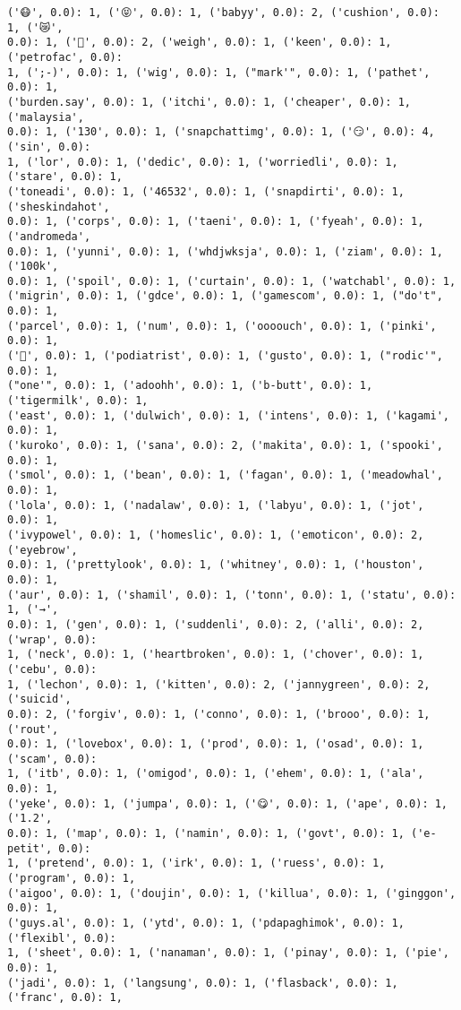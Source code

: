 \documentclass[11pt]{article}
\begin{document}
\begin{Verbatim}[commandchars=\\\{\}]
('😷', 0.0): 1, ('😝', 0.0): 1, ('babyy', 0.0): 2, ('cushion', 0.0): 1, ('😿',
0.0): 1, ('💓', 0.0): 2, ('weigh', 0.0): 1, ('keen', 0.0): 1, ('petrofac', 0.0):
1, (';-)', 0.0): 1, ('wig', 0.0): 1, ("mark'", 0.0): 1, ('pathet', 0.0): 1,
('burden.say', 0.0): 1, ('itchi', 0.0): 1, ('cheaper', 0.0): 1, ('malaysia',
0.0): 1, ('130', 0.0): 1, ('snapchattimg', 0.0): 1, ('😏', 0.0): 4, ('sin', 0.0):
1, ('lor', 0.0): 1, ('dedic', 0.0): 1, ('worriedli', 0.0): 1, ('stare', 0.0): 1,
('toneadi', 0.0): 1, ('46532', 0.0): 1, ('snapdirti', 0.0): 1, ('sheskindahot',
0.0): 1, ('corps', 0.0): 1, ('taeni', 0.0): 1, ('fyeah', 0.0): 1, ('andromeda',
0.0): 1, ('yunni', 0.0): 1, ('whdjwksja', 0.0): 1, ('ziam', 0.0): 1, ('100k',
0.0): 1, ('spoil', 0.0): 1, ('curtain', 0.0): 1, ('watchabl', 0.0): 1,
('migrin', 0.0): 1, ('gdce', 0.0): 1, ('gamescom', 0.0): 1, ("do't", 0.0): 1,
('parcel', 0.0): 1, ('num', 0.0): 1, ('oooouch', 0.0): 1, ('pinki', 0.0): 1,
('👣', 0.0): 1, ('podiatrist', 0.0): 1, ('gusto', 0.0): 1, ("rodic'", 0.0): 1,
("one'", 0.0): 1, ('adoohh', 0.0): 1, ('b-butt', 0.0): 1, ('tigermilk', 0.0): 1,
('east', 0.0): 1, ('dulwich', 0.0): 1, ('intens', 0.0): 1, ('kagami', 0.0): 1,
('kuroko', 0.0): 1, ('sana', 0.0): 2, ('makita', 0.0): 1, ('spooki', 0.0): 1,
('smol', 0.0): 1, ('bean', 0.0): 1, ('fagan', 0.0): 1, ('meadowhal', 0.0): 1,
('lola', 0.0): 1, ('nadalaw', 0.0): 1, ('labyu', 0.0): 1, ('jot', 0.0): 1,
('ivypowel', 0.0): 1, ('homeslic', 0.0): 1, ('emoticon', 0.0): 2, ('eyebrow',
0.0): 1, ('prettylook', 0.0): 1, ('whitney', 0.0): 1, ('houston', 0.0): 1,
('aur', 0.0): 1, ('shamil', 0.0): 1, ('tonn', 0.0): 1, ('statu', 0.0): 1, ('→',
0.0): 1, ('gen', 0.0): 1, ('suddenli', 0.0): 2, ('alli', 0.0): 2, ('wrap', 0.0):
1, ('neck', 0.0): 1, ('heartbroken', 0.0): 1, ('chover', 0.0): 1, ('cebu', 0.0):
1, ('lechon', 0.0): 1, ('kitten', 0.0): 2, ('jannygreen', 0.0): 2, ('suicid',
0.0): 2, ('forgiv', 0.0): 1, ('conno', 0.0): 1, ('brooo', 0.0): 1, ('rout',
0.0): 1, ('lovebox', 0.0): 1, ('prod', 0.0): 1, ('osad', 0.0): 1, ('scam', 0.0):
1, ('itb', 0.0): 1, ('omigod', 0.0): 1, ('ehem', 0.0): 1, ('ala', 0.0): 1,
('yeke', 0.0): 1, ('jumpa', 0.0): 1, ('😋', 0.0): 1, ('ape', 0.0): 1, ('1.2',
0.0): 1, ('map', 0.0): 1, ('namin', 0.0): 1, ('govt', 0.0): 1, ('e-petit', 0.0):
1, ('pretend', 0.0): 1, ('irk', 0.0): 1, ('ruess', 0.0): 1, ('program', 0.0): 1,
('aigoo', 0.0): 1, ('doujin', 0.0): 1, ('killua', 0.0): 1, ('ginggon', 0.0): 1,
('guys.al', 0.0): 1, ('ytd', 0.0): 1, ('pdapaghimok', 0.0): 1, ('flexibl', 0.0):
1, ('sheet', 0.0): 1, ('nanaman', 0.0): 1, ('pinay', 0.0): 1, ('pie', 0.0): 1,
('jadi', 0.0): 1, ('langsung', 0.0): 1, ('flasback', 0.0): 1, ('franc', 0.0): 1,

\end{Verbatim}
\end{document}
